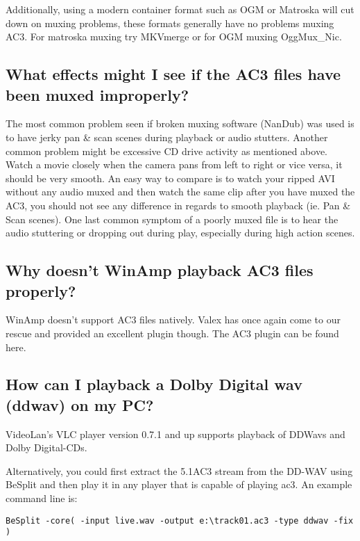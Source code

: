 ﻿\documentclass[12pt]{article}
\begin{document}
Additionally, using a modern container format such as OGM or Matroska will cut down on muxing
problems, these formats generally have no problems muxing AC3. For matroska muxing try MKVmerge or
for OGM muxing OggMux\_Nic.

\subsection{What effects might I see if the AC3 files have been muxed improperly?}

The most common problem seen if broken muxing software (NanDub) was used is to have jerky pan \&
scan scenes during playback or audio stutters. Another common problem might be excessive CD drive
activity as mentioned above. Watch a movie closely when the camera pans from left to right or vice
versa, it should be very smooth. An easy way to compare is to watch your ripped AVI without any
audio muxed and then watch the same clip after you have muxed the AC3, you should not see any
difference in regards to smooth playback (ie. Pan \& Scan scenes). One last common symptom of a
poorly muxed file is to hear the audio stuttering or dropping out during play, especially during
high action scenes.

\subsection{Why doesn't WinAmp playback AC3 files properly?}

WinAmp doesn't support AC3 files natively. Valex has once again come to our rescue and provided an
excellent plugin though. The AC3 plugin can be found here.

\subsection{How can I playback a Dolby Digital wav (ddwav) on my PC?}

VideoLan's VLC player version 0.7.1 and up supports playback of DDWavs and Dolby Digital-CDs.

Alternatively, you could first extract the 5.1AC3 stream from the DD-WAV using BeSplit and then play
it in any player that is capable of playing ac3. An example command line is:

\begin{lstlisting}
BeSplit -core( -input live.wav -output e:\track01.ac3 -type ddwav -fix )
\end{lstlisting}
\end{document}
